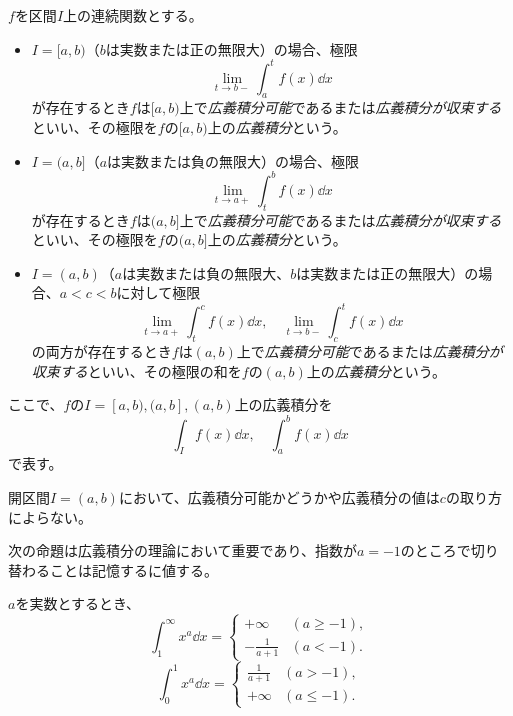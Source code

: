 \begin{definition}[広義積分]
$f$を区間$I$上の連続関数とする。
\begin{itemize}
\item
$I = [a, b)$（$b$は実数または正の無限大）の場合、極限
$$
\lim_{t \to b-}\int_a^t f(x)\dd{x}
$$
が存在するとき$f$は$[a, b)$上で\emph{広義積分可能}であるまたは\emph{広義積分が収束する}といい、その極限を$f$の$[a, b)$上の\emph{広義積分}という。
\item
$I = (a, b]$（$a$は実数または負の無限大）の場合、極限
$$
\lim_{t \to a+}\int_t^b f(x)\dd{x}
$$
が存在するとき$f$は$(a, b]$上で\emph{広義積分可能}であるまたは\emph{広義積分が収束する}といい、その極限を$f$の$(a, b]$上の\emph{広義積分}という。
\item
$I = (a, b)$（$a$は実数または負の無限大、$b$は実数または正の無限大）の場合、$a < c < b$に対して極限
$$
\lim_{t \to a+}\int_t^c f(x)\dd{x}, \quad \lim_{t \to b-}\int_c^t f(x)\dd{x} 
$$
の両方が存在するとき$f$は$(a, b)$上で\emph{広義積分可能}であるまたは\emph{広義積分が収束する}といい、その極限の和を$f$の$(a, b)$上の\emph{広義積分}という。
\end{itemize}
ここで、$f$の$I = [a, b), (a, b], (a, b)$上の広義積分を
$$
\int_I f(x)\dd{x},
\quad \int_a^b f(x)\dd{x}
$$
で表す。
\end{definition}

\begin{remark}
開区間$I = (a, b)$において、広義積分可能かどうかや広義積分の値は$c$の取り方によらない。
\end{remark}

次の命題は広義積分の理論において重要であり、指数が$a = -1$のところで切り替わることは記憶するに値する。

\begin{proposition}
$a$を実数とするとき、
$$
\int_1^\infty x^a\dd{x} =
\begin{cases}
+\infty & (a \ge -1), \\
-\frac{1}{a+1} & (a < -1).
\end{cases}
$$
$$
\int_0^1 x^a\dd{x} =
\begin{cases}
\frac{1}{a+1} & (a > -1), \\
+\infty & (a \le -1).
\end{cases}
$$
\end{proposition}

